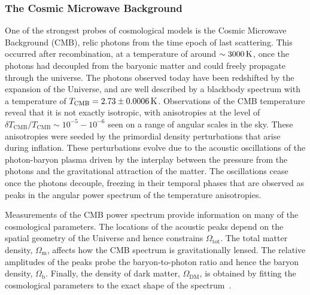 \subsubsection*{The Cosmic Microwave Background}
One of the strongest probes of cosmological models is the Cosmic Microwave Background (CMB), relic photons from the time epoch of last scattering. This occurred after recombination, at a temperature of around $\sim 3000 {\rm \,K}$, once the photons had decoupled from the baryonic matter and could freely propagate through the universe. The photons observed today have been redshifted by the expansion of the Universe, and are well described by a blackbody spectrum with a temperature of $T_\mathrm{CMB} = 2.73\pm 0.0006{\rm \,K}$. Observations of the CMB temperature reveal that it is not exactly isotropic, with anisotropies at the level of $\delta T_\mathrm{CMB}/T_\mathrm{CMB}\sim 10^{-5} - 10^{-6} $ seen on a range of angular scales in the sky. These anisotropies were seeded by the primordial density perturbations that arise during inflation. These perturbations evolve due to the acoustic oscillations of the photon-baryon plasma driven by the interplay between the pressure from the photons and the gravitational attraction of the matter. The oscillations cease once the photons decouple, freezing in their temporal phases that are observed as peaks in the angular power spectrum of the temperature anisotropies. 

Measurements of the CMB power spectrum provide information on many of the cosmological parameters. The locations of the acoustic peaks depend on the spatial geometry of the Universe and hence constrains $\Omega_\mathrm{tot}$. The total matter density, $\Omega_\mathrm{m}$, affects how the CMB spectrum is gravitationally lensed.  The relative amplitudes of the peaks probe the baryon-to-photon ratio and hence the baryon density, $\Omega_\mathrm{b}$. Finally, the density of dark matter, $\Omega_\mathrm{DM}$, is obtained by fitting the cosmological parameters to the exact shape of the spectrum~\cite{Freese:2008cz_may_ReviewObservationalEvidence, Planck:2018vyg_sep_Planck2018results}. 

